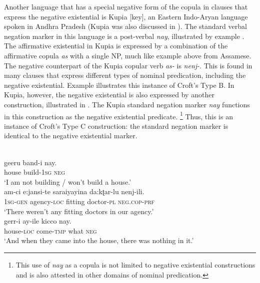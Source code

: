 \documentclass[output=paper,colorlinks,citecolor=brown]{langscibook}
\begin{document}
Another language that has a special negative form of the copula in clauses
that express the negative existential is Kupia [key], an Eastern
Indo-Aryan language spoken in Andhra Pradesh (Kupia was also discussed in
).  The standard verbal negation marker in this language is a
post-verbal \textit{nay}, illustrated by example
. The affirmative existential in Kupia is
expressed by a combination of the affirmative copula \textit{as} with a
single NP, much like example  above from
Assamese. The negative counterpart of the Kupia copular verb
\textit{as-} is \textit{nenj-}. This is found in many clauses that express
different types of nominal predication, including the negative existential.
Example  illustrates this instance of Croft's
Type B. In Kupia, however, the negative existential is also
expressed by another construction, illustrated in
. The Kupia standard negation
marker \textit{nay} functions in this construction as the negative
existential predicate.%
%
\footnote{This use of \textit{nay} as a copula is not
limited to negative existential constructions and is also attested in other
domains of nominal predication.} 
%
Thus, this is an instance of Croft's Type C construction: the standard
negation marker is identical to the negative existential marker. 
%
\begin{exe}\ex
\begin{xlist}
    \ex\label{ex:ieur-kupia-buildhouse}
\\
    \gll geeru band-i nay. \\
house build-\textsc{1sg} \textsc{neg} \\
    \glt `I am not building / won't build a house.'
\ex\label{ex:ieur-kupia-agency}
  \\
\gll am-ci e:jansi-te saraiyayina da:kʈar-lu   nenj-ili.\\
\textsc{1sg}-\textsc{gen} agency-\textsc{loc} fitting doctor-\textsc{pl}
\textsc{neg.cop-prf}\\
\glt `There weren't any fitting doctors in our agency.'
\ex\label{ex:ieur-kupia-emptyhouse}
\\
\gll gerr-i ay-ile kicco nay.\\
house-\textsc{loc} come-\textsc{tmp}   what   \textsc{neg}\\
\glt `And when they came into the house, there was nothing in it.'
\end{xlist}\end{exe}
\end{document}
